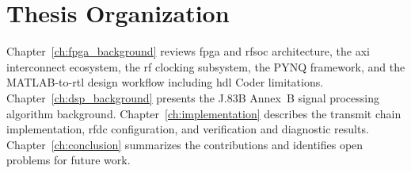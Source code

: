\section{Thesis Organization}
\label{sec:organization}

Chapter~\ref{ch:fpga_background} reviews \ac{fpga} and \ac{rfsoc}
architecture, the \ac{axi} interconnect ecosystem, the \ac{rf}
clocking subsystem, the PYNQ framework, and the MATLAB-to-\ac{rtl}
design workflow including \ac{hdl} Coder limitations.
Chapter~\ref{ch:dsp_background} presents the J.83B Annex~B signal processing
algorithm background.
Chapter~\ref{ch:implementation} describes the transmit chain
implementation, \ac{rfdc} configuration, and verification and
diagnostic results.
Chapter~\ref{ch:conclusion} summarizes the contributions and
identifies open problems for future work.

